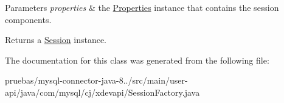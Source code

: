 \begin{DoxyParams}{Parameters}
{\em properties} & the \mbox{\hyperlink{}{Properties}} instance that contains the session components. \\
\hline
\end{DoxyParams}
\begin{DoxyReturn}{Returns}
a \mbox{\hyperlink{interfacecom_1_1mysql_1_1cj_1_1xdevapi_1_1_session}{Session}} instance. 
\end{DoxyReturn}


The documentation for this class was generated from the following file\+:\begin{DoxyCompactItemize}
\item 
pruebas/mysql-\/connector-\/java-\/8../src/main/user-\/api/java/com/mysql/cj/xdevapi/Session\+Factory.\+java\end{DoxyCompactItemize}
